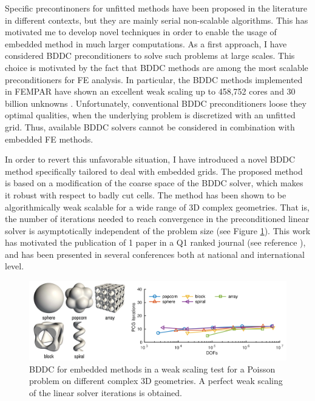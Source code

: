 \documentclass{article}
\begin{document}
Specific precontinoners for unfitted methods have been proposed in the literature in different contexts, but they are mainly serial non-scalable algorithms.  This has motivated me to develop novel techniques in order to enable the usage of embedded method in much larger computations. As a first approach, I have considered BDDC preconditioners to solve such problems at large scales. This choice is motivated by the fact that BDDC methods are among the most scalable preconditioners for FE analysis. In particular, the BDDC methods implemented in FEMPAR  have shown an excellent weak scaling up to 458,752 cores and 30 billion unknowns \cite{badia_2016}. Unfortunately, conventional BDDC preconditioners loose they optimal qualities, when the underlying problem is discretized with an unfitted grid. Thus, available BDDC solvers cannot be considered in combination with embedded FE methods. 

In order to revert this unfavorable situation, {{I have introduced a novel BDDC method  specifically tailored to deal with embedded grids}}. The proposed method is based on a modification of the coarse space of the BDDC solver,  which makes it robust with respect to badly cut cells. The method has been shown to be algorithmically weak scalable for a wide range of 3D complex geometries. That is, the number of iterations needed to reach convergence in the preconditioned linear solver is asymptotically independent of the problem size (see Figure \ref{fig:fitted-vs-unfitted-bddc}). This work has motivated the {{publication of 1 paper in a Q1 ranked journal}} (see reference \cite{badia_2017}), and has been presented in several conferences both at national and international level.

\begin{figure}[ht!]
\includegraphics[width=\textwidth]{../_assets/fig2.png}
\caption{BDDC for embedded methods in a weak scaling test for a Poisson problem on different complex  3D geometries. A perfect weak scaling of the linear solver iterations is obtained.}
\label{fig:fitted-vs-unfitted-bddc}
\end{figure}
\end{document}
